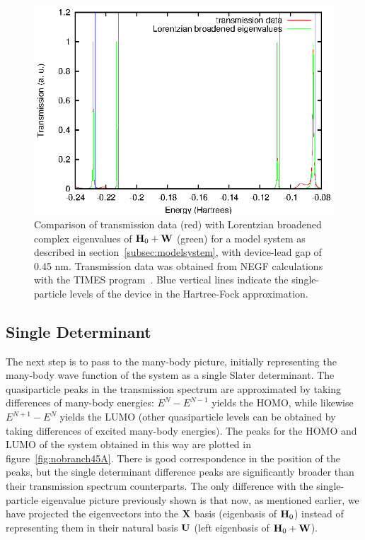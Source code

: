 \begin{figure} 
	\begin{center}
		\includegraphics[width=0.9\linewidth]{figures/4evals}
	\end{center}
	\caption{Comparison of transmission data (red) with Lorentzian
	broadened complex eigenvalues of $\mathbf{H}_0 + \mathbf{W}$ (green) for a
	model system as described in section~\ref{subsec:modelsystem}, with
	device-lead gap of 0.45 nm. Transmission data was obtained from
	\ac{NEGF} calculations with the TIMES program~\cite{times}.
        Blue vertical lines indicate the single-particle levels of the device
        in the Hartree-Fock approximation.}
	\label{fig:4evals}
\end{figure}

\subsection{Single Determinant}
\label{subsec:SingleDeterminant}

The next step is to pass to the many-body picture, initially representing the
many-body wave function of the system as a single Slater determinant. The
quasiparticle peaks in the transmission spectrum are approximated by taking
differences of many-body energies: $E^N - E^{N-1}$ yields the \ac{HOMO}, while
likewise $E^{N+1} - E^N$ yields the \ac{LUMO} (other quasiparticle levels can be
obtained by taking differences of excited many-body energies). The peaks for
the \ac{HOMO} and \ac{LUMO} of the system obtained in this way are plotted in
figure~\ref{fig:nobranch45A}. There is good correspondence in the position of the
peaks, but the single determinant difference peaks are significantly broader
than their transmission spectrum counterparts. The only difference with the
single-particle eigenvalue picture previously shown is that now, as mentioned
earlier, we have projected the eigenvectors into the $\mathbf{X}$ basis (eigenbasis
of $\mathbf{H}_0$) instead of representing them in their natural basis $\mathbf{U}$
(left eigenbasis of $\mathbf{H}_0 + \mathbf{W}$).

